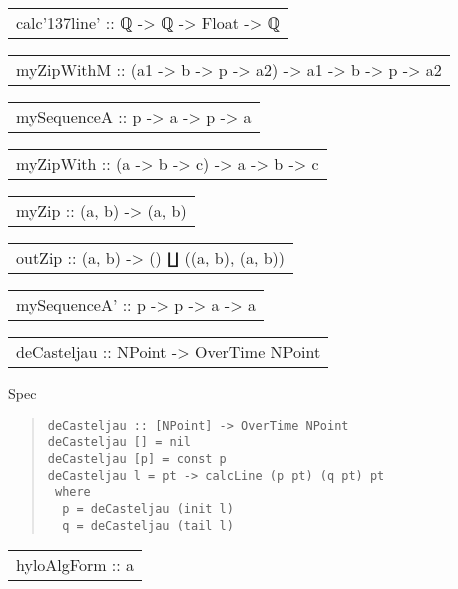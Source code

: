 \begin{haddockdesc}
\item[\begin{tabular}{@{}l}
calc{\char '137}line' :: {\char 91}ℚ{\char 93} -> {\char 91}ℚ{\char 93} -> Float -> {\char 91}ℚ{\char 93}
\end{tabular}]
\item[\begin{tabular}{@{}l}
myZipWithM :: (a1 -> b -> p -> a2) -> {\char 91}a1{\char 93} -> {\char 91}b{\char 93} -> p -> {\char 91}a2{\char 93}
\end{tabular}]
\item[\begin{tabular}{@{}l}
mySequenceA :: {\char 91}p -> a{\char 93} -> p -> {\char 91}a{\char 93}
\end{tabular}]
\item[\begin{tabular}{@{}l}
myZipWith :: (a -> b -> c) -> {\char 91}a{\char 93} -> {\char 91}b{\char 93} -> {\char 91}c{\char 93}
\end{tabular}]
\item[\begin{tabular}{@{}l}
myZip :: ({\char 91}a{\char 93}, {\char 91}b{\char 93}) -> {\char 91}(a, b){\char 93}
\end{tabular}]
\item[\begin{tabular}{@{}l}
outZip :: ({\char 91}a{\char 93}, {\char 91}b{\char 93}) -> () ∐ ((a, b), ({\char 91}a{\char 93}, {\char 91}b{\char 93}))
\end{tabular}]
\item[\begin{tabular}{@{}l}
mySequenceA' :: p -> {\char 91}p -> a{\char 93} -> {\char 91}a{\char 93}
\end{tabular}]
\end{haddockdesc}
\begin{haddockdesc}
\item[\begin{tabular}{@{}l}
deCasteljau :: {\char 91}NPoint{\char 93} -> OverTime NPoint
\end{tabular}]
{\haddockbegindoc
Spec\par
\begin{quote}
{\haddockverb\begin{verbatim}
deCasteljau :: [NPoint] -> OverTime NPoint
deCasteljau [] = nil
deCasteljau [p] = const p
deCasteljau l = pt -> calcLine (p pt) (q pt) pt
 where
  p = deCasteljau (init l)
  q = deCasteljau (tail l)
 \end{verbatim}}
\end{quote}}
\end{haddockdesc}
\begin{haddockdesc}
\item[\begin{tabular}{@{}l}
hyloAlgForm :: a
\end{tabular}]
\end{haddockdesc}
